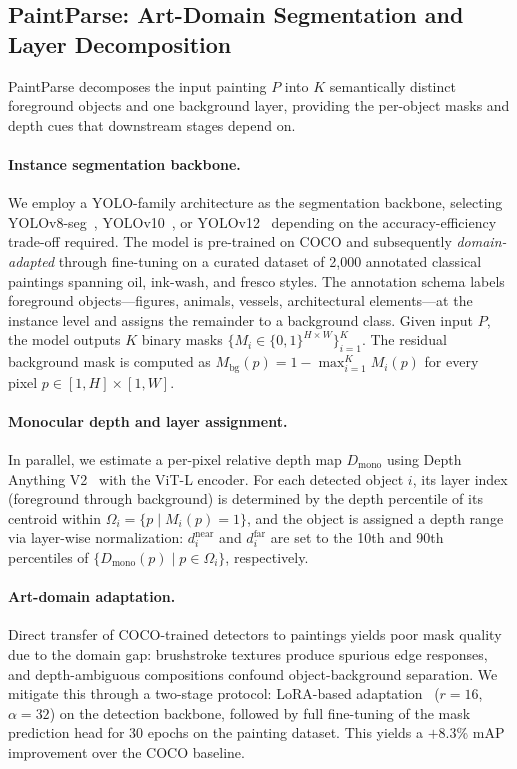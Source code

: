 \subsection{PaintParse: Art-Domain Segmentation and Layer Decomposition}
\label{sec:method:paintparse}

PaintParse decomposes the input painting $P$ into $K$ semantically distinct
foreground objects and one background layer, providing the per-object masks and
depth cues that downstream stages depend on.

\paragraph{Instance segmentation backbone.}
We employ a YOLO-family architecture as the segmentation backbone, selecting
YOLOv8-seg~\cite{jocher2023yolov8}, YOLOv10~\cite{wang2024yolov10}, or
YOLOv12~\cite{tian2025yolov12} depending on the accuracy-efficiency trade-off
required. The model is pre-trained on COCO and subsequently
\emph{domain-adapted} through fine-tuning on a curated dataset of 2{,}000
annotated classical paintings spanning oil, ink-wash, and fresco styles. The
annotation schema labels foreground objects---figures, animals, vessels,
architectural elements---at the instance level and assigns the remainder to a
background class. Given input $P$, the model outputs $K$ binary masks
$\{M_i \in \{0,1\}^{H\times W}\}_{i=1}^{K}$. The residual background mask is
computed as $M_\text{bg}(p) = 1 - \max_{i=1}^{K} M_i(p)$ for every pixel
$p \in [1,H]\times[1,W]$.

\paragraph{Monocular depth and layer assignment.}
In parallel, we estimate a per-pixel relative depth map $D_\text{mono}$ using
Depth Anything V2~\cite{yang2024depthanything} with the ViT-L encoder. For each
detected object $i$, its layer index (foreground through background) is
determined by the depth percentile of its centroid within $\Omega_i = \{p \mid
M_i(p)=1\}$, and the object is assigned a depth range via layer-wise
normalization: $d_i^\text{near}$ and $d_i^\text{far}$ are set to the 10th and
90th percentiles of $\{D_\text{mono}(p) \mid p \in \Omega_i\}$, respectively.

\paragraph{Art-domain adaptation.}
Direct transfer of COCO-trained detectors to paintings yields poor mask quality
due to the domain gap: brushstroke textures produce spurious edge responses, and
depth-ambiguous compositions confound object-background separation. We mitigate
this through a two-stage protocol: LoRA-based adaptation~\cite{hu2022lora}
($r=16$, $\alpha=32$) on the detection backbone, followed by full fine-tuning of
the mask prediction head for 30 epochs on the painting dataset. This yields a
$+8.3\%$ mAP improvement over the COCO baseline.

